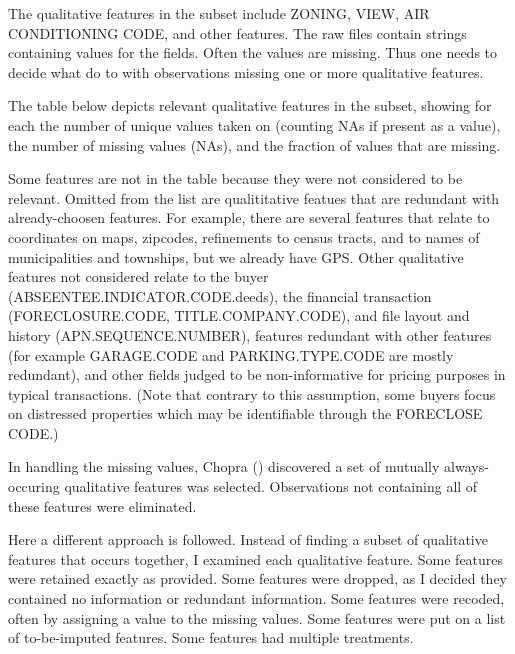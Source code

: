 The qualitative features in the subset include ZONING, VIEW,
AIR CONDITIONING CODE, and other features. The raw files contain
strings containing values for the fields. Often the values are
missing. Thus one needs to decide what do to with observations missing
one or more qualitative features.

The table below depicts relevant qualitative features in the subset,
showing for each the number of unique values taken on (counting NAs if
present as a value), the number of missing values (NAs), and the
fraction of values that are missing. 



Some features are not in the table because they were not considered to
be relevant. Omitted from the list are qualititative featues that are
redundant with already-choosen features. For example, there are
several features that relate to coordinates on maps, zipcodes,
refinements to census tracts, and to names of municipalities and
townships, but we already have GPS. Other qualitative
features not considered relate to the buyer
(ABSEENTEE.INDICATOR.CODE.deeds), the financial transaction
(FORECLOSURE.CODE, TITLE.COMPANY.CODE), and file layout and history
(APN.SEQUENCE.NUMBER), features redundant with other features (for
example GARAGE.CODE and PARKING.TYPE.CODE are mostly redundant), and
other fields judged to be non-informative for pricing purposes in typical
transactions. (Note that contrary to this assumption, some buyers focus
on distressed properties which may be identifiable through the FORECLOSE
CODE.)

In handling the missing values, Chopra (\cite[p.~87]{chopra-09})
discovered a set of mutually always-occuring qualitative features was
selected. Observations not containing all of these features were
eliminated.

Here a different approach is followed. Instead of finding a subset of
qualitative features that occurs together, I examined each qualitative
feature. Some features were retained exactly as provided. Some
features were dropped, as I decided they contained no information or
redundant information. Some features were recoded, often by assigning
a value to the missing values. Some features were put on a list of
to-be-imputed features. Some features had multiple treatments.


